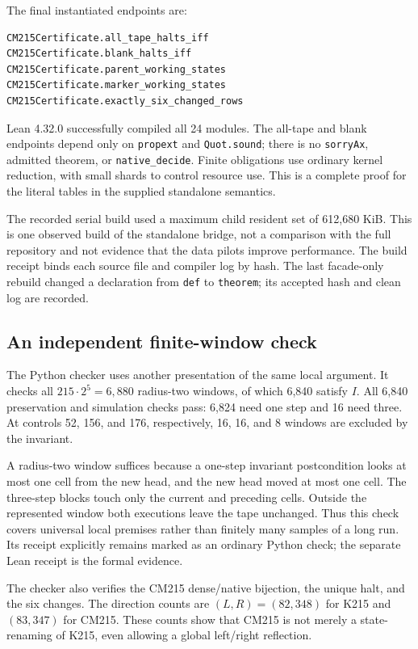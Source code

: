 \documentclass[11pt]{article}
\begin{document}
The final instantiated endpoints are:
\begin{lstlisting}
CM215Certificate.all_tape_halts_iff
CM215Certificate.blank_halts_iff
CM215Certificate.parent_working_states
CM215Certificate.marker_working_states
CM215Certificate.exactly_six_changed_rows
\end{lstlisting}
Lean 4.32.0 successfully compiled all 24 modules. The all-tape and blank endpoints depend only on \texttt{propext} and \texttt{Quot.sound}; there is no \texttt{sorryAx}, admitted theorem, or \texttt{native\_decide}. Finite obligations use ordinary kernel reduction, with small shards to control resource use. This is a complete proof for the literal tables in the supplied standalone semantics.

The recorded serial build used a maximum child resident set of 612,680 KiB. This is one observed build of the standalone bridge, not a comparison with the full repository and not evidence that the data pilots improve performance. The build receipt binds each source file and compiler log by hash. The last facade-only rebuild changed a declaration from \texttt{def} to \texttt{theorem}; its accepted hash and clean log are recorded.

\subsection{An independent finite-window check}

The Python checker uses another presentation of the same local argument. It checks all $215\cdot2^5=6,880$ radius-two windows, of which 6,840 satisfy $I$. All 6,840 preservation and simulation checks pass: 6,824 need one step and 16 need three. At controls 52, 156, and 176, respectively, 16, 16, and 8 windows are excluded by the invariant.

A radius-two window suffices because a one-step invariant postcondition looks at most one cell from the new head, and the new head moved at most one cell. The three-step blocks touch only the current and preceding cells. Outside the represented window both executions leave the tape unchanged. Thus this check covers universal local premises rather than finitely many samples of a long run. Its receipt explicitly remains marked as an ordinary Python check; the separate Lean receipt is the formal evidence.

The checker also verifies the CM215 dense/native bijection, the unique halt, and the six changes. The direction counts are $(L,R)=(82,348)$ for K215 and $(83,347)$ for CM215. These counts show that CM215 is not merely a state-renaming of K215, even allowing a global left/right reflection.
\end{document}
